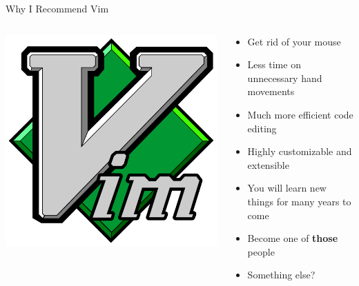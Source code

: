 \documentclass{beamer}
\begin{document}
\usebackgroundtemplate{}
\begin{frame}{Why I Recommend Vim}
    \begin{columns}
        \begin{column}{0.4\textwidth}
            \begin{center}
                \includegraphics[width=1\textwidth]{images/vim-logo.png}
            \end{center}
        \end{column}
        \begin{column}{0.6\textwidth}
            \begin{itemize}
                \item Get rid of your mouse
                \item Less time on unnecessary hand movements
                \item Much more efficient code editing
                \item Highly customizable and extensible
                \item You will learn new things for many years to come
                \item Become one of \textbf{those} people
                \item Something else?
            \end{itemize}
        \end{column}
    \end{columns}
\end{frame}
\end{document}
